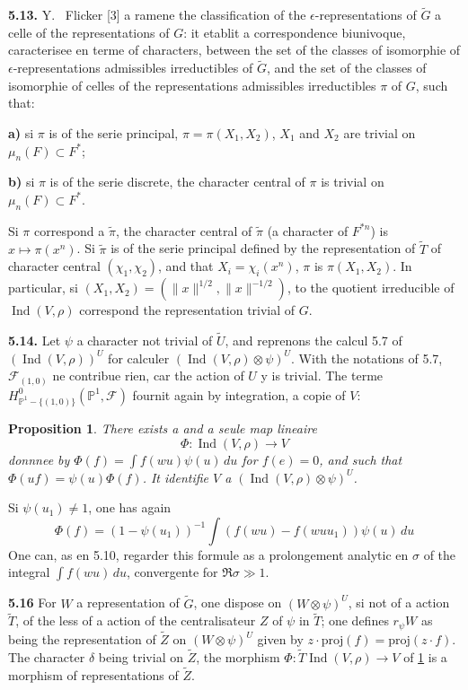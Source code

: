 \documentclass[12pt,a4paper]{article}
\theoremstyle{plain}
\newtheorem{proposition}[theorem]{Proposition}
\theoremstyle{definition}
\theoremstyle{remark}
\DeclareMathOperator{\Ind}{Ind}
\newcommand{\wt}{\widetilde}
\newcommand{\cF}{\mathscr{F}}
\newcommand{\PP}{\mathbb{P}}
\providecommand{\PP}{\mathbb{P}}
\providecommand{\cF}{\mathcal{F}}
\begin{document}
\textbf{5.13.} Y.
\ Flicker [3] a ramene the classification of the $\epsilon$-representations of $\wt{G}$ a celle of the representations of $G$: it etablit a correspondence biunivoque, caracterisee en terme of characters, between the set of the classes of isomorphie of $\epsilon$-representations admissibles irreductibles of $\wt{G}$, and the set of the classes of isomorphie of celles of the representations admissibles irreductibles $\pi$ of $G$, such that:

\textbf{a)} si $\pi$ is of the serie principal, $\pi = \pi(X_1, X_2)$, $X_1$ and $X_2$ are trivial on $\mu_n(F) \subset F^*$;

\textbf{b)} si $\pi$ is of the serie discrete, the character central of $\pi$ is trivial on $\mu_n(F) \subset F^*$.

Si $\pi$ correspond a $\wt{\pi}$, the character central of $\wt{\pi}$ (a character of $F^{*n}$) is $x \mapsto \pi(x^n)$. Si $\wt{\pi}$ is of the serie principal defined by the representation of $\wt{T}$ of character central $(\chi_1, \chi_2)$, and that $X_i = \chi_i(x^n)$, $\pi$ is $\pi(X_1, X_2)$. In particular, si $(X_1, X_2) = (\|x\|^{1/2}, \|x\|^{-1/2})$, to the quotient irreducible of $\Ind(V, \rho)$ correspond the representation trivial of $G$.

\textbf{5.14.} Let $\psi$ a character not trivial of $\wt{U}$, and reprenons the calcul 5.7 of $(\Ind(V, \rho))^U$ for calculer $(\Ind(V, \rho) \otimes \psi)^U$. With the notations of 5.7, $\cF_{(1,0)}$ ne contribue rien, car the action of $U$ y is trivial. The terme $H^0_{\PP^1 - \{(1,0)\}}(\PP^1, \cF)$ fournit again by integration, a copie of $V$:

\begin{proposition}\label{prop:5.15}
There exists a and a seule map lineaire
\[
\Phi : \Ind(V, \rho) \longrightarrow V
\]
donnnee by $\Phi(f) = \int f(wu) \psi(u) \, du$ for $f(e) = 0$, and such that $\Phi(uf) = \psi(u) \Phi(f)$. It identifie $V$ a $(\Ind(V, \rho) \otimes \psi)^U$.
\end{proposition}

Si $\psi(u_1) \neq 1$, one has again
\begin{equation}\label{eq:5.15.1}
\Phi(f) = (1 - \psi(u_1))^{-1} \int (f(wu) - f(wuu_1)) \psi(u) \, du
\tag{5.15.1}
\end{equation}
One can, as en 5.10, regarder this formule as a prolongement analytic en $\sigma$ of the integral $\int f(wu) \, du$, convergente for $\Re \sigma \gg 1$.

\textbf{5.16} For $W$ a representation of $\wt{G}$, one dispose on $(W \otimes \psi)^U$, si not of a action $\wt{T}$, of the less of a action of the centralisateur $Z$ of $\psi$ in $\wt{T}$; one defines $r_\psi W$ as being the representation of $\wt{Z}$ on $(W \otimes \psi)^U$ given by $z \cdot \mathrm{proj}(f) = \mathrm{proj}(z \cdot f)$. The character $\delta$ being trivial on $\wt{Z}$, the morphism $\Phi : \wt{T} \Ind(V, \rho) \to V$ of \ref{prop:5.15} is a morphism of representations of $\wt{Z}$.
\end{document}
